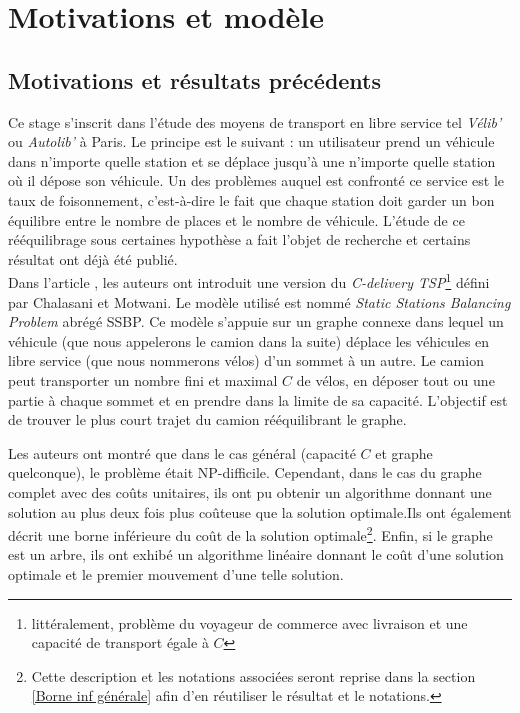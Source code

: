 \documentclass[twoside,11pt,openany,a4paper]{rapport}
\begin{document}
\section{Motivations et modèle}

\subsection{Motivations et résultats précédents}
Ce stage s'inscrit dans l'étude des moyens de transport en libre service tel \emph{Vélib'} ou \emph{Autolib'} à Paris. Le principe est le suivant : un utilisateur prend un véhicule dans n'importe quelle station et se déplace jusqu'à une n'importe quelle station où il dépose son véhicule. Un des problèmes auquel est confronté ce service est le taux de foisonnement, c'est-à-dire le fait que chaque station doit garder un bon équilibre entre le nombre de places et le nombre de véhicule. L'étude de ce rééquilibrage sous certaines hypothèse a fait l'objet de recherche et certains résultat ont déjà été publié.
\\

Dans l'article \cite{Benchimol2011}, les auteurs ont introduit une version du \emph{C-delivery TSP}\footnote{littéralement, problème du voyageur de commerce avec livraison et une capacité de transport égale à $C$} défini par Chalasani et Motwani. Le modèle utilisé est nommé \emph{Static Stations Balancing Problem} abrégé SSBP. Ce modèle s'appuie sur un graphe connexe dans lequel un véhicule (que nous appelerons le camion dans la suite) déplace les véhicules en libre service (que nous nommerons vélos) d'un sommet à un autre. Le camion peut transporter un nombre fini et maximal $C$ de vélos, en déposer tout ou une partie à chaque sommet et en prendre dans la limite de sa capacité. L'objectif est de trouver le plus court trajet du camion rééquilibrant le graphe.

Les auteurs ont montré que dans le cas général (capacité $C$ et graphe quelconque), le problème était NP-difficile. Cependant, dans le cas du graphe complet avec des coûts unitaires, ils ont pu obtenir un algorithme donnant une solution au plus deux fois plus coûteuse que la solution optimale.Ils ont également décrit une borne inférieure du coût de la solution optimale\footnote{Cette description et les notations associées seront reprise dans la section \ref{Borne inf générale} afin d'en réutiliser le résultat et le notations.}. Enfin, si le graphe est un arbre, ils ont exhibé un algorithme linéaire donnant le coût d'une solution optimale et le premier mouvement d'une telle solution.
\\
\end{document}
